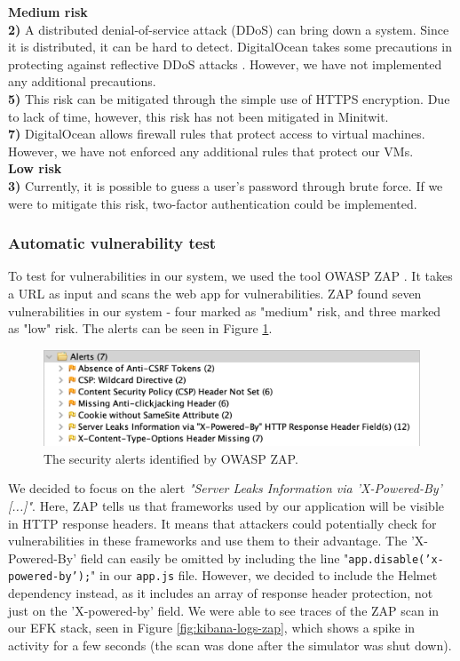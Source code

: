 \noindent \textbf{Medium risk}\\
\indent \textbf{2)} A distributed denial-of-service attack (DDoS) can bring down a system. Since it is distributed, it can be hard to detect. DigitalOcean takes some precautions in protecting against reflective DDoS attacks \cite{ddos_digitalocean}. However, we have not implemented any additional precautions.\\  
    
\textbf{5)} This risk can be mitigated through the simple use of HTTPS encryption. Due to lack of time, however, this risk has not been mitigated in Minitwit.\\ 

\textbf{7)} DigitalOcean allows firewall rules that protect access to virtual machines. However, we have not enforced any additional rules that protect our VMs.\\

\noindent \textbf{Low risk}\\ 
\indent \textbf{3)} Currently, it is possible to guess a user's password through brute force. If we were to mitigate this risk, two-factor authentication could be implemented.

\subsubsection{Automatic vulnerability test}
To test for vulnerabilities in our system, we used the tool OWASP ZAP \cite{owasp_zap}. It takes a URL as input and scans the web app for vulnerabilities. ZAP found seven vulnerabilities in our system - four marked as "medium" risk, and three marked as "low" risk. The alerts can be seen in Figure \ref{fig:zap-alerts}.

\begin{figure}[H]
    \centering
    \includegraphics[width=.6\linewidth]{images/zap-alerts.png}
    \caption{The security alerts identified by OWASP ZAP.}
    \label{fig:zap-alerts}
\end{figure}

We decided to focus on the alert \textit{"Server Leaks Information via 'X-Powered-By' [...]"}. Here, ZAP tells us that frameworks used by our application will be visible in HTTP response headers. It means that attackers could potentially check for vulnerabilities in these frameworks and use them to their advantage. The 'X-Powered-By' field can easily be omitted by including the line "\texttt{app.disable('x-powered-by');}" in our \texttt{app.js} file. However, we decided to include the Helmet dependency \cite{helmet} instead, as it includes an array of response header protection, not just on the 'X-powered-by' field. We were able to see traces of the ZAP scan in our EFK stack, seen in Figure \ref{fig:kibana-logs-zap}, which shows a spike in activity for a few seconds (the scan was done after the simulator was shut down).

